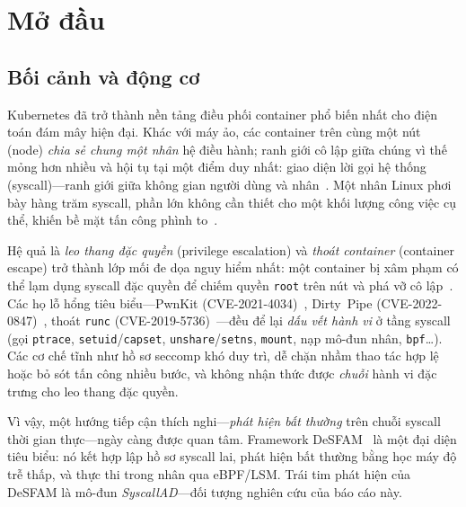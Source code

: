 \section{Mở đầu}
\label{sec:intro}

\subsection{Bối cảnh và động cơ}
Kubernetes đã trở thành nền tảng điều phối container phổ biến nhất cho điện toán
đám mây hiện đại. Khác với máy ảo, các container trên cùng một nút (node)
\emph{chia sẻ chung một nhân} hệ điều hành; ranh giới cô lập giữa chúng vì thế mỏng
hơn nhiều và hội tụ tại một điểm duy nhất: giao diện lời gọi hệ thống
(syscall)---ranh giới giữa không gian người dùng và nhân~\cite{ref1_jarkas_survey,
ref3_sultan_survey}. Một nhân Linux phơi bày hàng trăm syscall, phần lớn không cần
thiết cho một khối lượng công việc cụ thể, khiến bề mặt tấn công phình
to~\cite{ref11_shu_security}.

Hệ quả là \emph{leo thang đặc quyền} (privilege escalation) và \emph{thoát
container} (container escape) trở thành lớp mối đe dọa nguy hiểm nhất: một container
bị xâm phạm có thể lạm dụng syscall đặc quyền để chiếm quyền \texttt{root} trên nút
và phá vỡ cô lập~\cite{ref5_combe_docker}. Các họ lỗ hổng tiêu biểu---PwnKit
(\mbox{CVE-2021-4034})~\cite{cve_2021_4034}, Dirty~Pipe
(\mbox{CVE-2022-0847})~\cite{cve_2022_0847}, thoát \texttt{runc}
(\mbox{CVE-2019-5736})~\cite{cve_2019_5736}---đều để lại \emph{dấu vết hành vi} ở
tầng syscall (gọi \texttt{ptrace}, \texttt{setuid}/\texttt{capset},
\texttt{unshare}/\texttt{setns}, \texttt{mount}, nạp mô-đun nhân, \texttt{bpf}\dots).
Các cơ chế tĩnh như hồ sơ seccomp khó duy trì, dễ chặn nhầm thao tác hợp lệ hoặc bỏ
sót tấn công nhiều bước, và không nhận thức được \emph{chuỗi} hành vi đặc trưng cho
leo thang đặc quyền.

Vì vậy, một hướng tiếp cận thích nghi---\emph{phát hiện bất thường} trên chuỗi
syscall thời gian thực---ngày càng được quan tâm. Framework
DeSFAM~\cite{desfam_original} là một đại diện tiêu biểu: nó kết hợp lập hồ sơ syscall
lai, phát hiện bất thường bằng học máy độ trễ thấp, và thực thi trong nhân qua
eBPF/LSM. Trái tim phát hiện của DeSFAM là mô-đun \emph{SyscallAD}---đối tượng
nghiên cứu của báo cáo này.

